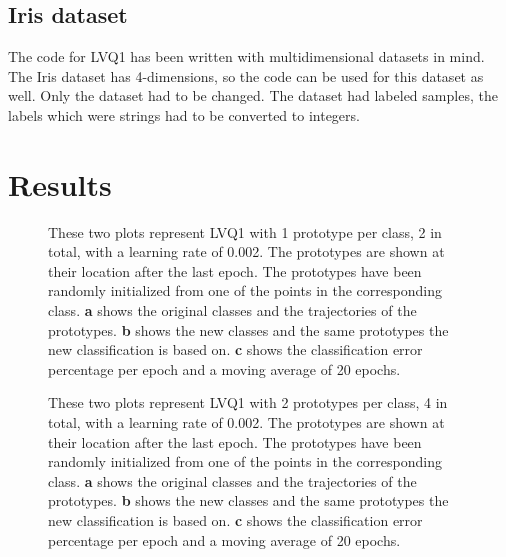 \documentclass[twoside, a4paper, fleqn, reqno]{article}
\begin{document}
\subsection*{Iris dataset}
	The code for LVQ1 has been written with multidimensional datasets in mind. The Iris
	dataset has 4-dimensions, so the code can be used for this dataset as well.
	Only the dataset had to be changed. The dataset had labeled samples, the labels
	which were strings had to be converted to integers.

\section*{Results}

\begin{figure}[H]
	\centering
	\hfill
	\hfill
	\caption{
		These two plots represent LVQ1 with 1 prototype per class, 2 in total, with a learning rate of 0.002.
		The prototypes are shown at their location after the last epoch. The prototypes have been
		randomly initialized from one of the points in the corresponding class.
		\textbf{a} shows the original classes and the trajectories of the prototypes.
		\textbf{b} shows the new classes and the same prototypes the new classification is based on.
		\textbf{c} shows the classification error percentage per epoch and a moving average of 20 epochs.
	}
\end{figure}

\begin{figure}[H]
	\centering
	\hfill
	\hfill
	\caption{
		These two plots represent LVQ1 with 2 prototypes per class, 4 in total, with a learning rate of 0.002.
		The prototypes are shown at their location after the last epoch. The prototypes have been
		randomly initialized from one of the points in the corresponding class.
		\textbf{a} shows the original classes and the trajectories of the prototypes.
		\textbf{b} shows the new classes and the same prototypes the new classification is based on.
		\textbf{c} shows the classification error percentage per epoch and a moving average of 20 epochs.
	}
\end{figure}
\end{document}
